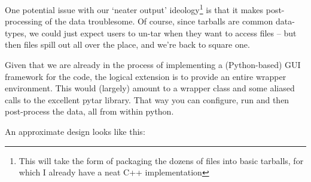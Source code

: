 \documentclass[a4paper,10pt]{article}
\begin{document}
			One potential issue with our `neater output' ideology\footnote{This will take the form of packaging the dozens of files into basic tarballs, for which I already have a neat C++ implementation} is that it makes post-processing of the data troublesome. Of course, since tarballs are common data-types, we could just expect users to un-tar when they want to access files -- but then files spill out all over the place, and we're back to square one.

			Given that we are already in the process of implementing a (Python-based) GUI framework for the code, the logical extension is to provide an entire wrapper environment. This would (largely) amount to a wrapper class and some aliased calls to the excellent pytar library. That way you can configure, run and then post-process the data, all from within python.

			An approximate design looks like this:
			\begin{center}
			\end{center}
\end{document}
